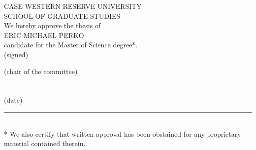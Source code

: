 \thispagestyle{empty}
\begin{doublespace}
	\begin{center}
		{ \large CASE WESTERN RESERVE UNIVERSITY }\\[0.5in]
		{ \large SCHOOL OF GRADUATE STUDIES }\\[0.5in]
		
		We hereby approve the thesis of
		\\[0.3in]
		ERIC MICHAEL PERKO
		\\[0.3in]
		candidate for the Master of Science degree*.
		\\[0.5in]

		(signed)\hrulefill
		
		(chair of the committee)\\[0.5in]

		\hrulefill\\[0.5in]
		
		\hrulefill\\[0.5in]
		
		(date)\rule{0.5\textwidth}{0.4pt}\\[0.3in]

		* We also certify that written approval has been obstained for any proprietary material contained therein.

	\end{center}
\end{doublespace}